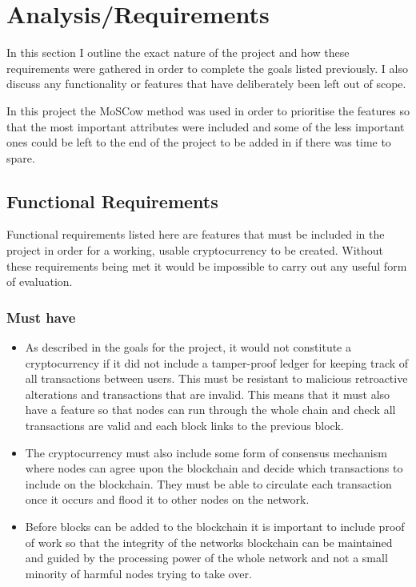 \documentclass{l4proj}
\begin{document}
\chapter{Analysis/Requirements}
In this section I outline the exact nature of the project and how these requirements were gathered in order to 
complete the goals listed previously. I also discuss any functionality or features that have deliberately been
left out of scope.

In this project the MoSCow method \citep{moscow} was used in order to prioritise the features so that the most important attributes
were included and some of the less important ones could be left to the end of the project to be added in if there was
time to spare.


\section{Functional Requirements}
Functional requirements listed here are features that must be included in the project in order for a working,
usable cryptocurrency to be created. Without these requirements being met it would be impossible to carry out any
useful form of evaluation.

\subsection{Must have}
\begin{itemize}
    \item As described in the goals for the project, it would not constitute a cryptocurrency if it did not include a tamper-proof
        ledger for keeping track of all transactions between users. This must be resistant to malicious retroactive alterations
        and transactions that are invalid. This means that it must also have a feature so that nodes can run through the 
        whole chain and check all transactions are valid and each block links to the previous block.

    \item The cryptocurrency must also include some form of consensus mechanism where nodes can agree upon the blockchain
        and decide which transactions to include on the blockchain. They must be able to circulate each transaction once
        it occurs and flood it to other nodes on the network.
    
    \item Before blocks can be added to the blockchain it is important to include proof of work so that the integrity of the 
        networks blockchain can be maintained and guided by the processing power of the whole network and not a small minority
        of harmful nodes trying to take over.
\end{itemize}
\end{document}
